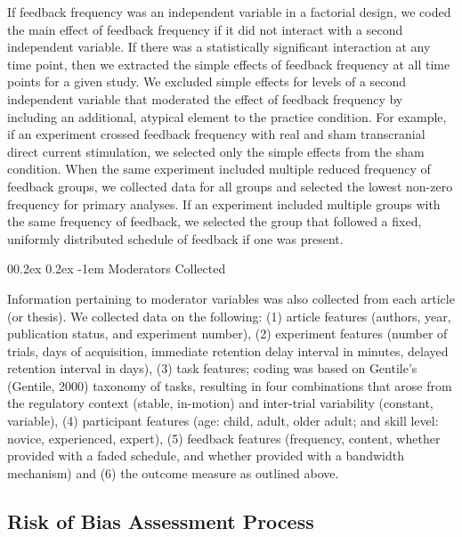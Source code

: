 \documentclass[
  english,
  man, donotrepeattitle,mask,floatsintext]{apa7}
\makeatletter
\let\oldparagraph\paragraph
\renewcommand{\paragraph}[1]{\oldparagraph{#1}\mbox{}}
\renewcommand{\paragraph}{\@startsection{paragraph}{4}{\parindent}%
  {0\baselineskip \@plus 0.2ex \@minus 0.2ex}%
  {-1em}%
  {\normalfont\normalsize\bfseries\itshape\typesectitle}}
\makeatother
\begin{document}
If feedback frequency was an independent variable in a factorial design, we coded the main effect of feedback frequency if it did not interact with a second independent variable. If there was a statistically significant interaction at any time point, then we extracted the simple effects of feedback frequency at all time points for a given study. We excluded simple effects for levels of a second independent variable that moderated the effect of feedback frequency by including an additional, atypical element to the practice condition. For example, if an experiment crossed feedback frequency with real and sham transcranial direct current stimulation, we selected only the simple effects from the sham condition. When the same experiment included multiple reduced frequency of feedback groups, we collected data for all groups and selected the lowest non-zero frequency for primary analyses. If an experiment included multiple groups with the same frequency of feedback, we selected the group that followed a fixed, uniformly distributed schedule of feedback if one was present.

\hypertarget{moderators-collected}{%
\paragraph{Moderators Collected}\label{moderators-collected}}

Information pertaining to moderator variables was also collected from each article (or thesis). We collected data on the following: (1) article features (authors, year, publication status, and experiment number), (2) experiment features (number of trials, days of acquisition, immediate retention delay interval in minutes, delayed retention interval in days), (3) task features; coding was based on Gentile's (Gentile, 2000) taxonomy of tasks, resulting in four combinations that arose from the regulatory context (stable, in-motion) and inter-trial variability (constant, variable), (4) participant features (age: child, adult, older adult; and skill level: novice, experienced, expert), (5) feedback features (frequency, content, whether provided with a faded schedule, and whether provided with a bandwidth mechanism) and (6) the outcome measure as outlined above.

\hypertarget{risk-of-bias-assessment-process}{%
\subsection{Risk of Bias Assessment Process}\label{risk-of-bias-assessment-process}}
\end{document}
